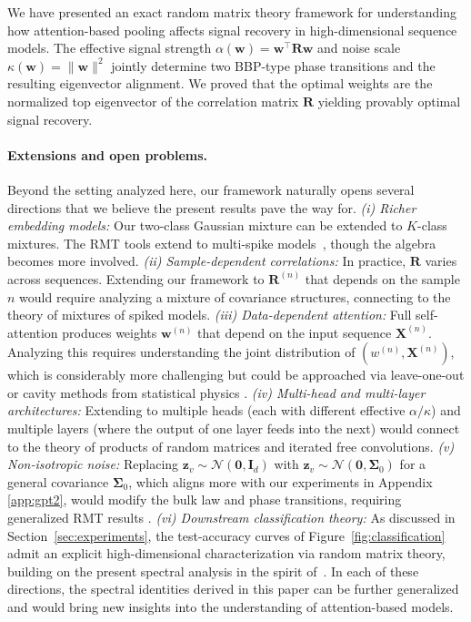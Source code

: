 \documentclass{article}
\def\vzero{{\bm{0}}}
\def\vw{{\bm{w}}}
\def\vz{{\bm{z}}}
\def\mI{{\bm{I}}}
\def\mR{{\bm{R}}}
\def\mX{{\bm{X}}}
\def\mSigma{{\bm{\Sigma}}}
\def\gN{{\mathcal{N}}}
\begin{document}
We have presented an exact random matrix theory framework for understanding how attention-based pooling affects signal recovery in high-dimensional sequence models. The effective signal strength $\alpha(\vw) = \vw^\top\mR\vw$ and noise scale $\kappa(\vw) = \|\vw\|^2$ jointly determine two BBP-type phase transitions and the resulting eigenvector alignment. We proved that the optimal weights are the normalized top eigenvector of the correlation matrix $\mR$ yielding provably optimal signal recovery. 

\paragraph{Extensions and open problems.} Beyond the setting analyzed here, our framework naturally opens several directions that we believe the present results pave the way for. \textit{(i) Richer embedding models:} Our two-class Gaussian mixture can be extended to $K$-class mixtures. The RMT tools extend to multi-spike models~\citep{benaych2011eigenvalues}, though the algebra becomes more involved. \textit{(ii) Sample-dependent correlations:} In practice, $\mR$ varies across sequences. Extending our framework to $\mR^{(n)}$ that depends on the sample $n$ would require analyzing a mixture of covariance structures, connecting to the theory of mixtures of spiked models. \textit{(iii) Data-dependent attention:} Full self-attention produces weights $\vw^{(n)}$ that depend on the input sequence $\mX^{(n)}$. Analyzing this requires understanding the joint distribution of $(w^{(n)}, \mX^{(n)})$, which is considerably more challenging but could be approached via leave-one-out or cavity methods from statistical physics \citep{mezard2003cavity}. \textit{(iv) Multi-head and multi-layer architectures:} Extending to multiple heads (each with different effective $\alpha/\kappa$) and multiple layers (where the output of one layer feeds into the next) would connect to the theory of products of random matrices and iterated free convolutions. \textit{(v) Non-isotropic noise:} Replacing $\vz_v \sim \gN(\vzero, \mI_d)$ with $\vz_v \sim \gN(\vzero, \mSigma_0)$ for a general covariance $\mSigma_0$, which aligns more with our experiments in Appendix \ref{app:gpt2}, would modify the bulk law and phase transitions, requiring generalized RMT results \citep{silverstein1995empirical}. \textit{(vi) Downstream classification theory:} As discussed in Section~\ref{sec:experiments}, the test-accuracy curves of Figure~\ref{fig:classification} admit an explicit high-dimensional characterization via random matrix theory, building on the present spectral analysis in the spirit of~\citep{firdoussi2024high, demir2025asymptotic}. In each of these directions, the spectral identities derived in this paper can be further generalized and would bring new insights into the understanding of attention-based models.
\end{document}
